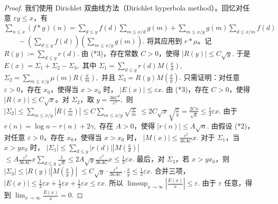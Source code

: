 \begin{proof}
	我们使用 Dirichlet 双曲线方法（Dirichlet hyperbola method）。回忆对任意 $\varepsilon y\leq x$，有
	\(\textstyle \sum_{n\leq\allowbreak{} x}(f*g)(n) =\allowbreak{} \sum_{d\leq\allowbreak{} y}f(d)\sum_{m\leq\allowbreak{} x/d}g(m) +\allowbreak{} \sum_{m\leq\allowbreak{} x/y}g(m)\sum_{d\leq\allowbreak{} x/m}f(d)\) \(\textstyle \qquad - \left(\sum_{d\leq\allowbreak{} y}f(d)\right) \left(\sum_{m\leq\allowbreak{} x/y}g(m)\right).\)
	将其应用到 $r*\mu$。记
	\(\textstyle R(y):=\allowbreak{}\sum_{d\leq\allowbreak{} y}r(d).\)
	由 (*3)，存在常数 $C>0$，使得
	\(\textstyle |R(y)|\leq\allowbreak{} C\sqrt y.\)
	于是
	\(\textstyle E(x)=\allowbreak{}\Sigma_1+\allowbreak{}\Sigma_2-\Sigma_3,\allowbreak{}\)
	其中
	\(\textstyle \Sigma_1=\allowbreak{}\sum_{d\leq\allowbreak{} y}r(d)M\left(\frac xd\right),\allowbreak{}\)
	\(\textstyle \Sigma_2=\allowbreak{}\sum_{m\leq\allowbreak{} x/y}\mu(m)R\left(\frac xm\right),\allowbreak{}\)
	并且
	\(\textstyle \Sigma_3=\allowbreak{}R(y)M\left(\frac xy\right).\)
	只需证明：对任意 $\varepsilon>0$，存在 $x_0$，使得当 $x>x_0$ 时，
	\(\textstyle |E(x)|\leq\allowbreak{} \varepsilon x.\)
	由 (*3)，存在 $C>0$，使得 $|R(x)|\leq C\sqrt x$。对 $\Sigma_2$，取
	\(\textstyle y=\allowbreak{}\frac{36C^2}{\varepsilon^2},\allowbreak{}\)
	则
	\(\textstyle |\Sigma_2| \leq\allowbreak{} \sum_{m\leq\allowbreak{} x/y}\left|R\left(\frac xm\right)\right| \leq\allowbreak{} C\sum_{m\leq\allowbreak{} x/y}\sqrt{\frac xm}\) \(\textstyle \leq\allowbreak{} 2C\sqrt x\sqrt{\frac xy} =\allowbreak{} \frac{2Cx}{\sqrt y} \leq\allowbreak{} \frac13\varepsilon x.\)
	由于
	\(\textstyle r(n)=\allowbreak{}\log n-\tau(n)+\allowbreak{}2\gamma,\allowbreak{}\)
	存在 $A>0$，使得
	\(\textstyle |r(n)|\leq\allowbreak{} A\sqrt n.\)
	由假设 (*2)，对任意 $\varepsilon>0$，存在 $x_0$，使得当 $x>x_0$ 时，
	\(\textstyle |M(x)|\leq\allowbreak{} \frac{\varepsilon^2}{36AC}x.\)
	对于 $\Sigma_1$，当 $x>yx_0$ 时，
	\(\textstyle |\Sigma_1| \leq\allowbreak{} \sum_{d\leq\allowbreak{} y}|r(d)|\left|M\left(\frac xd\right)\right|\) \(\textstyle \leq\allowbreak{} A\frac{\varepsilon^2}{36AC}x \sum_{d\leq\allowbreak{} y}\frac1{\sqrt d} \leq\allowbreak{} 2A\sqrt y\frac{\varepsilon^2}{36AC}x \leq\allowbreak{} \frac13\varepsilon x.\)
	最后，对 $\Sigma_3$，若 $x>yx_0$，则
	\(\textstyle |\Sigma_3| \leq\allowbreak{} |R(y)|\left|M\left(\frac xy\right)\right|\) \(\textstyle \leq\allowbreak{} C\sqrt y\cdot \frac{\varepsilon^2}{36AC}\cdot \frac xy \leq\allowbreak{} \frac13\varepsilon x.\)
	合并三项，
	\(\textstyle |E(x)| \leq\allowbreak{} \frac13\varepsilon x+\allowbreak{}\frac13\varepsilon x+\allowbreak{}\frac13\varepsilon x \leq\allowbreak{} \varepsilon x.\)
	所以
	\(\textstyle \limsup_{x\to\allowbreak{}\infty}\left|\frac{E(x)}x\right|\leq\allowbreak{} \varepsilon.\)
	由于 $\varepsilon$ 任意，得到
	\(\textstyle \lim_{x\to\allowbreak{}\infty}\frac{E(x)}x=\allowbreak{}0.\)
\end{proof}

